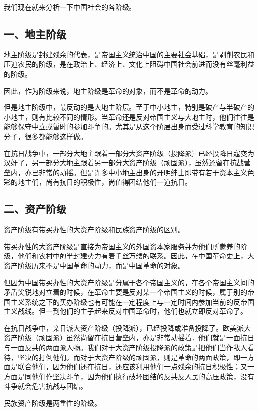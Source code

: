 我们现在就来分析一下中国社会的各阶级。

\subsection{一、地主阶级}

地主阶级是封建残余的代表，是帝国主义统治中国的主要社会基础，是剥削农民和压迫农民的阶级，是在政治上、经济上、文化上阻碍中国社会前进而没有丝毫利益的阶级。

因此，作为阶级来说，地主阶级是革命的对象，而不是革命的动力。

但是地主阶级中，最反动的是大地主阶层。至于中小地主，特别是破产与半破产的小地主，则有比较不同的情形。当革命还是反对帝国主义与大地主时，他们往往是能够保守中立或暂时的参加斗争的。尤其是从这个阶层出身而受过科学教育的知识分子，很多都能够这样做。

在抗日战争中，一部分大地主跟着一部分大资产阶级（投降派）已经投降日寇变为汉奸了，另一部分大地主跟着另一部分大资产阶级（顽固派），虽然还留在抗战营垒内，亦已非常的动摇。但是许多中小地主出身的开明绅士即带有若干资本主义色彩的地主们，尚有抗日的积极性，尚值得团结他们一道抗日。

\subsection{二、资产阶级}

资产阶级有带买办性的大资产阶级和民族资产阶级的区别。

带买办性的大资产阶级是直接为帝国主义的外国资本家服务并为他们所豢养的阶级，他们和农村中的半封建势力有着千丝万缕的联系。因此，在中国革命史上，大资产阶级历来不是中国革命的动力，而是中国革命的对象。

但因为中国带买办性的大资产阶级是分属于各个帝国主义的，在各个帝国主义间的矛盾尖锐地对立着的时候，在革命主要是反对某一个帝国主义的时候，属于别的帝国主义系统之下的买办阶级也有可能在一定程度上与一定时间内参加当前的反帝国主义战线。但一到他们的主子起来反对中国革命时，他们也就立即反对革命了。

在抗日战争中，亲日派大资产阶级（投降派），已经投降或准备投降了。欧美派大资产阶级（顽固派）虽然尚留在抗日营垒内，亦是非常动摇着，他们就是一面抗日与一面反共的两面派人物。我们对于大资产阶级投降派的政策是把他们当作敌人看待，坚决的打倒他们。而对于大资产阶级的顽固派，则是革命的两面政策，即一方面是联合他们，因为他们还在抗日，还应该利用他们一点残余的抗日积极性；又一方面是同他们作坚决斗争，因为他们执行破坏团结的反共反人民的高压政策，没有斗争就会危害抗战与团结。

民族资产阶级是两重性的阶级。

